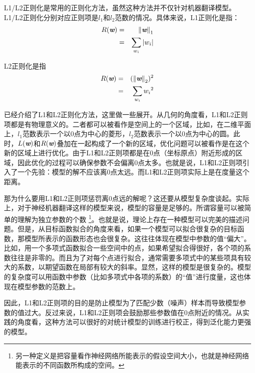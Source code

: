 \parinterval L1/L2正则化是常用的正则化方法，虽然这种方法并不仅针对机器翻译模型。L1/L2正则化分别对应正则项是$l_1$和$l_2$范数的情况。具体来说，L1正则化是指：
\begin{eqnarray}
R(\textbf{\em w}) & = & {\Vert{\textbf{\em w}}\Vert}_1 \\
			     & =  &\sum_{w_i}|w_i| \nonumber
\label{eq:13-3}
\end{eqnarray}

\parinterval L2正则化是指
\begin{eqnarray}
R(\textbf{\em w}) & = & ({\Vert{\textbf{\em w}}\Vert}_2)^2 \\
			     & =  &\sum_{w_i}{w_i}^2 \nonumber
\label{eq:13-4}
\end{eqnarray}

\parinterval {\chapternine}已经介绍了L1和L2正则化方法，这里做一些展开。从几何的角度看，L1和L2正则项都是有物理意义的。二者都可以被看作是空间上的一个区域，比如，在二维平面上，$l_1$范数表示一个以0点为中心的菱形，$l_2$范数表示一个以0点为中心的圆。此时，$L(\textbf{\em w})$和$R(\textbf{\em w})$叠加在一起构成了一个新的区域，优化问题可以被看作是在这个新的区域上进行优化。由于L1和L2正则项都是在0点（坐标原点）附近形成的区域，因此优化的过程可以确保参数不会偏离0点太多。也就是说，L1和L2正则项引入了一个先验：模型的解不应该离0点太远。而L1和L2正则项实际上是在度量这个距离。

\parinterval 那为什么要用L1和L2正则项惩罚离0点远的解呢？这还要从模型复杂度谈起。实际上，对于神经机器翻译这样的模型来说，模型的容量是足够的。所谓容量可以被简单的理解为独立参数的个数 \footnote{另一种定义是把容量看作神经网络所能表示的假设空间大小，也就是神经网络能表示的不同函数所构成的空间。}。也就是说，理论上存在一种模型可以完美的描述问题。但是，从目标函数拟合的角度来看，如果一个模型可以拟合很复杂的目标函数，那模型所表示的函数形态也会很复杂。这往往体现在模型中参数的值“偏大”。比如，用一个多项式函数拟合一些空间中的点，如果希望拟合得很好，各个项的系数往往是非零的。而且为了对每个点进行拟合，通常需要多项式中的某些项具有较大的系数，以期望函数在局部有较大的斜率。显然，这样的模型是很复杂的。模型的复杂度可以用函数中参数（比如多项式中各项的系数）的“值”进行度量，这也体现在模型参数的范数上。

\parinterval 因此，L1和L2正则项的目的是防止模型为了匹配少数（噪声）样本而导致模型参数的值过大。反过来说，L1和L2正则项会鼓励那些参数值在0点附近的情况。从实践的角度看，这种方法可以很好的对统计模型的训练进行校正，得到泛化能力更强的模型。


